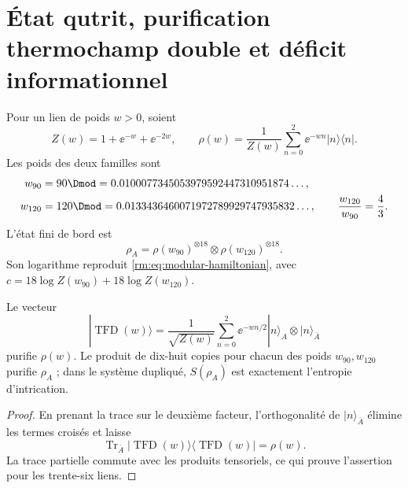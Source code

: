 \section{État qutrit, purification thermochamp double et déficit informationnel}

Pour un lien de poids \(w>0\), soient
\begin{equation}
\label{rm:eq:modular-link-state}
Z(w)=1+\ee^{-w}+\ee^{-2w},
\qquad
\rho(w)=\frac1{Z(w)}\sum_{n=0}^2\ee^{-wn}|n\rangle\langle n|.
\end{equation}
Les poids des deux familles sont
\begin{align}
w_{90}&=90\Dmod
=0.0100077345053979592447310951874\ldots,
\label{rm:eq:modular-w90}\\
w_{120}&=120\Dmod
=0.0133436460071972789929747935832\ldots,
\qquad \frac{w_{120}}{w_{90}}=\frac43.
\label{rm:eq:modular-w120}
\end{align}
L’état fini de bord est
\begin{equation}
\label{rm:eq:modular-product-state}
\rho_A=\rho(w_{90})^{\otimes18}
\otimes\rho(w_{120})^{\otimes18}.
\end{equation}
Son logarithme reproduit \cref{rm:eq:modular-hamiltonian}, avec \(c=18\log Z(w_{90})+18\log Z(w_{120})\).

\begin{theorem}
\label{rm:thm:modular-tfd}
Le vecteur
\begin{equation}
\label{rm:eq:modular-tfd-link}
|\operatorname{TFD}(w)\rangle
=\frac1{\sqrt{Z(w)}}\sum_{n=0}^2
\ee^{-wn/2}|n\rangle_A\otimes|n\rangle_{\bar A}
\end{equation}
purifie \(\rho(w)\). Le produit de dix-huit copies pour chacun des poids \(w_{90},w_{120}\) purifie \(\rho_A\) ; dans le système dupliqué, \(S(\rho_A)\) est exactement l’entropie d’intrication.
\end{theorem}

\begin{proof}
En prenant la trace sur le deuxième facteur, l’orthogonalité de \(|n\rangle_{\bar A}\) élimine les termes croisés et laisse
\[
\operatorname{Tr}_{\bar A}
|\operatorname{TFD}(w)\rangle\langle\operatorname{TFD}(w)|
=\rho(w).
\]
La trace partielle commute avec les produits tensoriels, ce qui prouve l’assertion pour les trente-six liens.
\end{proof}

